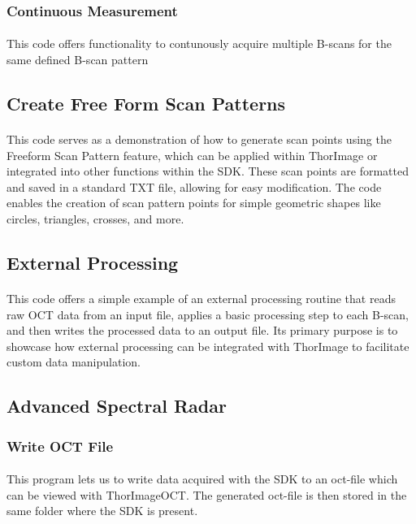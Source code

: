 \subsubsection{Continuous Measurement}
\paragraph{}
This code offers functionality to contunously acquire multiple B-scans for the same defined B-scan pattern

\subsection{Create Free Form Scan Patterns}
\paragraph{}
This code serves as a demonstration of how to generate scan points using the Freeform Scan Pattern feature, which can be applied within ThorImage or integrated into other functions within the SDK. These scan points are formatted and saved in a standard TXT file, allowing for easy modification. The code enables the creation of scan pattern points for simple geometric shapes like circles, triangles, crosses, and more.

\subsection{External Processing}
\paragraph{}
This code offers a simple example of an external processing routine that reads raw OCT data from an input file, applies a basic processing step to each B-scan, and then writes the processed data to an output file. Its primary purpose is to showcase how external processing can be integrated with ThorImage to facilitate custom data manipulation.

\subsection{Advanced Spectral Radar}
\subsubsection{Write OCT File}
\paragraph{}
This program lets us to write data acquired with the SDK to an oct-file which can be viewed with ThorImageOCT. The generated oct-file is then stored in the same folder where the SDK is present.

